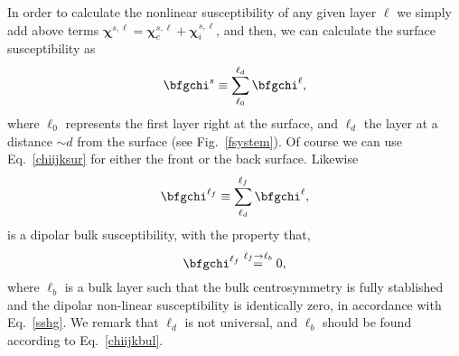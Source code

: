 \documentclass[floatfix,prb,aps,superscriptaddress,11pt,preprint,letterpaper]{revtex4}
\begin{document}
In order to calculate
the nonlinear susceptibility of any given layer $\ell$ we simply add above terms
$\boldsymbol{\chi}^{s,\ell}=\boldsymbol{\chi}_e^{s,\ell}+\boldsymbol{\chi}_i^{s,\ell}$, 
and 
then,
we can calculate the surface
susceptibility as 
\begin{equation}\label{chiijksur}
\bfgchi^s\equiv \sum_{\ell_0}^{\ell_d}\bfgchi^{\ell},
\end{equation}
where $\ell_0$ represents the first  layer right at the surface, and $\ell_d$ the
layer at a distance $\sim d$ from the surface (see
Fig.~\ref{fsystem}). Of course we can use Eq.~\eqref{chiijksur} for
either the front or the back surface.
Likewise
\begin{equation}\label{chiijklf}
\bfgchi^{\ell_f}\equiv \sum_{\ell_d}^{\ell_f}\bfgchi^{\ell},
\end{equation}
is a dipolar bulk susceptibility, with the property that,
\begin{equation}\label{chiijkbul}
\bfgchi^{\ell_f}\stackrel{\ell_f \to \ell_b}{=} 0,
\end{equation}
where $\ell_b$ is a bulk layer such that the bulk centrosymmetry is
fully stablished and the dipolar non-linear susceptibility is
identically zero, in accordance with Eq.~\eqref{sshg}. We remark that 
$\ell_d$  is
not universal, and $\ell_b$ should be found according to Eq.~\eqref{chiijkbul}. 
\end{document}
